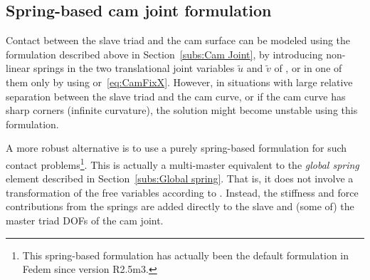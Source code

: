 %
%

%
%

\subsection{Spring-based cam joint formulation}
\label{subs:Spring-based cam joint formulation}

Contact between the slave triad and the cam surface can be modeled using the
formulation described above in Section~\ref{subs:Cam Joint}, by introducing
non-linear springs in the two translational joint variables $\tilde u$ and
$\tilde v$ of , or in one of them only by using
 or~\eqref{eq:CamFixX}.
However, in situations with large relative separation between the slave triad
and the cam curve, or if the cam curve has sharp corners (infinite curvature),
the solution might become unstable using this formulation.

A more robust alternative is to use a purely spring-based formulation for such
contact problems\footnote{This spring-based formulation has actually been the
default formulation in Fedem since version R2.5m3.}.
This is actually a multi-master equivalent to the {\em global spring\/}
element described in Section~\ref{subs:Global spring}.
That is, it does not involve a transformation of the free variables according to
.
Instead, the stiffness and force contributions from the springs are added
directly to the slave and (some of) the master triad DOFs of the cam joint.

